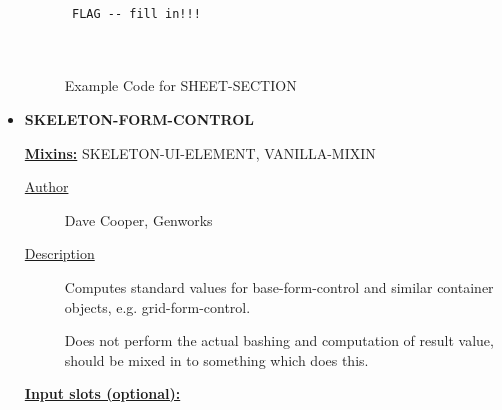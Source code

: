 \documentclass [11pt]{book}
\begin{document}
\begin{itemize}
\begin{description}
\end{description}




\begin{figure}
\begin{lrbox}{\boxedverb}
\begin{minipage}{\linewidth}
{\small

\begin{verbatim}

 FLAG -- fill in!!!



\end{verbatim}}
\end{minipage}
\end{lrbox}
\fbox{\usebox{\boxedverb}}

\caption{Example Code for SHEET-SECTION}

\label{fig:example-code-SHEET-SECTION}

\end{figure}






\item {}
\textbf{SKELETON-FORM-CONTROL}


\textbf{
\underline{Mixins:}} SKELETON-UI-ELEMENT, VANILLA-MIXIN





\begin{description}

\item [
\underline{Author}]


Dave Cooper, Genworks



\item [
\underline{Description}]


Computes standard values for base-form-control and similar container objects, e.g. grid-form-control.

Does not perform the actual bashing and computation of result value, should be mixed in to something which does this.



\end{description}








\textbf{
\underline{Input slots (optional):}}

\begin{description}


\end{description}
\end{itemize}
\end{document}
